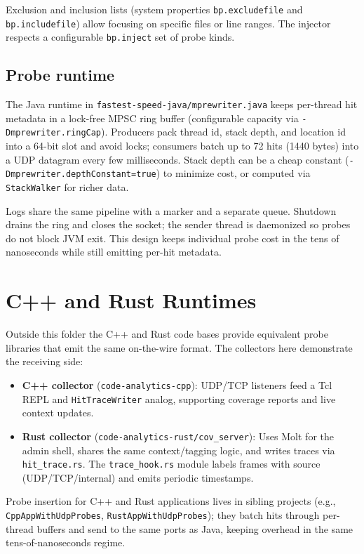 \documentclass[11pt]{article}
\begin{document}
Exclusion and inclusion lists (system properties \texttt{bp.excludefile} and \texttt{bp.includefile}) allow focusing on specific files or line ranges. The injector respects a configurable \texttt{bp.inject} set of probe kinds.

\subsection{Probe runtime}
The Java runtime in \texttt{fastest-speed-java/mprewriter.java} keeps per-thread hit metadata in a lock-free MPSC ring buffer (configurable capacity via \texttt{-Dmprewriter.ringCap}). Producers pack thread id, stack depth, and location id into a 64-bit slot and avoid locks; consumers batch up to 72 hits (1440 bytes) into a UDP datagram every few milliseconds. Stack depth can be a cheap constant (\texttt{-Dmprewriter.depthConstant=true}) to minimize cost, or computed via \texttt{StackWalker} for richer data.

Logs share the same pipeline with a marker and a separate queue. Shutdown drains the ring and closes the socket; the sender thread is daemonized so probes do not block JVM exit. This design keeps individual probe cost in the tens of nanoseconds while still emitting per-hit metadata.

\section{C++ and Rust Runtimes}
Outside this folder the C++ and Rust code bases provide equivalent probe libraries that emit the same on-the-wire format. The collectors here demonstrate the receiving side:
\begin{itemize}[noitemsep]
  \item \textbf{C++ collector} (\texttt{code-analytics-cpp}): UDP/TCP listeners feed a Tcl REPL and \texttt{HitTraceWriter} analog, supporting coverage reports and live context updates.
  \item \textbf{Rust collector} (\texttt{code-analytics-rust/cov\_server}): Uses Molt for the admin shell, shares the same context/tagging logic, and writes traces via \texttt{hit\_trace.rs}. The \texttt{trace\_hook.rs} module labels frames with source (UDP/TCP/internal) and emits periodic timestamps.
\end{itemize}
Probe insertion for C++ and Rust applications lives in sibling projects (e.g., \texttt{CppAppWithUdpProbes}, \texttt{RustAppWithUdpProbes}); they batch hits through per-thread buffers and send to the same ports as Java, keeping overhead in the same tens-of-nanoseconds regime.
\end{document}
